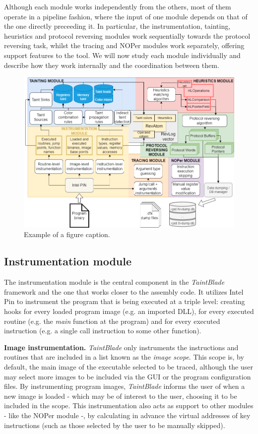 \documentclass[conference]{IEEEtran}
\begin{document}
Although each module works independently from the others, most of them operate
in a pipeline fashion, where the input of one module depends on that of the one
directly preceeding it. In particular, the instrumentation, tainting,
heuristics and protocol reversing modules work sequentially towards the
protocol reversing task, whilst the tracing and NOPer modules work separately,
offering support features to the tool. We will now study each module
individually and describe how they work internally and the coordination between
them.

\begin{figure}
    \centerline{\includegraphics[width=\textwidth]{images/archdetailedsteps.drawio.png}}
    \caption{Example of a figure caption.}
    \label{figure:fig_3_archdetailedsteps}
\end{figure}

\subsection{Instrumentation module}
The instrumentation module is the central component in the \textit{TaintBlade}
framework and the one that works closer to the assembly code. It utilizes Intel
Pin to instrument the program that is being executed at a triple level:
creating hooks for every loaded program image (e.g. an imported DLL), for every
executed routine (e.g. the \textit{main} function at the program) and for every
executed instruction (e.g. a single call instruction to some other function).

\textbf{Image instrumentation.}
\textit{TaintBlade} only instruments the instructions and routines that are included
in a list known as the \textit{image scope}. This scope is, by default, the main image of the executable
selected to be traced, although the user may select more images to be included via the GUI or
the program configuration files. By instrumenting program images, \textit{TaintBlade} informs the
user of when a new image is loaded - which may be of interest to the user, choosing it to be included
in the scope. This instrumentation also acts as support to other modules - like the NOPer module -, by calculating in
advance the virtual addresses of key instructions (such as those selected by the user to be manually skipped).
\end{document}
